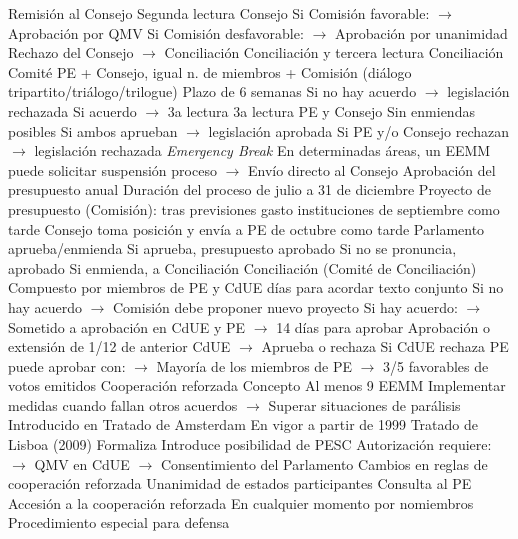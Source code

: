 \documentclass{nuevotema}
\begin{document}
\begin{esquemal}
				\4[$\to$] Remisión al Consejo
				\4[] Segunda lectura Consejo
				\4[] Si Comisión favorable:
				\4[] $\to$ Aprobación por QMV
				\4[] Si Comisión desfavorable:
				\4[] $\to$ Aprobación por unanimidad
				\4[] Rechazo del Consejo $\to$ Conciliación
				\4[3] Conciliación y tercera lectura
				\4[] Conciliación
				\4[] Comité PE + Consejo, igual n. de miembros + Comisión
				\4[] (diálogo tripartito/triálogo/trilogue)
				\4[] Plazo de 6 semanas
				\4[] Si no hay acuerdo $\to$ legislación rechazada
				\4[] Si acuerdo $\to$ 3a lectura
				\4[] 3a lectura PE y Consejo
				\4[] Sin enmiendas posibles
				\4[] Si ambos aprueban $\to$ legislación aprobada
				\4[] Si PE y/o Consejo rechazan $\to$ legislación rechazada
				\4 \textit{Emergency Break}
				\4[] En determinadas áreas, un EEMM puede solicitar suspensión proceso
				\4[] $\to$ Envío directo al Consejo
			\3 Aprobación del presupuesto anual
				\4 Duración del proceso
				 de julio a 31 de diciembre
				\4[1.] Proyecto de presupuesto (Comisión):
				\4[] tras previsiones gasto instituciones
				 de septiembre como tarde
				\4[2.] Consejo toma posición y envía a PE
				 de octubre como tarde
				\4[3.] Parlamento aprueba/enmienda
				\4[] Si aprueba, presupuesto aprobado
				\4[] Si no se pronuncia, aprobado
				\4[] Si enmienda, a Conciliación
				\4[4.] Conciliación (Comité de Conciliación)
				\4[] Compuesto por miembros de PE y CdUE
				 días para acordar texto conjunto
				\4[] Si no hay acuerdo
				\4[] $\to$ Comisión debe proponer nuevo proyecto
				\4[] Si hay acuerdo:
				\4[] $\to$ Sometido a aprobación en CdUE y PE
				\4[] $\to$ 14 días para aprobar
				\4[5.] Aprobación o extensión de 1/12 de anterior
				\4[] CdUE
				\4[] $\to$ Aprueba o rechaza
				\4[] Si CdUE rechaza PE puede aprobar con:
				\4[] $\to$ Mayoría de los miembros de PE
				\4[] $\to$ 3/5 favorables de votos emitidos
			\3 Cooperación reforzada
				\4 Concepto
				\4[] Al menos 9 EEMM
				\4[] Implementar medidas cuando fallan otros acuerdos
				\4[] $\to$ Superar situaciones de parálisis
				\4 Introducido en Tratado de Amsterdam
				\4[] En vigor a partir de 1999
				\4 Tratado de Lisboa (2009)
				\4[] Formaliza
				\4[] Introduce posibilidad de PESC
				\4 Autorización requiere:
				\4[] $\to$  QMV en CdUE
				\4[] $\to$ Consentimiento del Parlamento
				\4 Cambios en reglas de cooperación reforzada
				\4[] Unanimidad de estados participantes
				\4[] Consulta al PE
				\4 Accesión a la cooperación reforzada
				\4[] En cualquier momento por nomiembros
				\4 Procedimiento especial para defensa

\end{esquemal}
\end{document}
